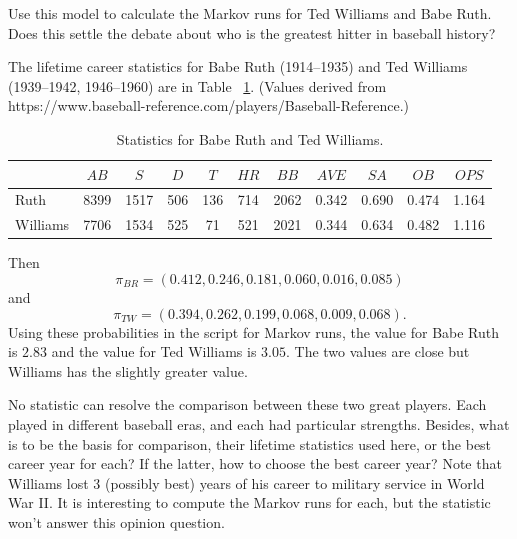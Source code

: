 \documentclass[12pt]{article}
\begin{document}
\begin{exercise}
    Use this model to calculate the Markov runs for Ted Williams and
    Babe Ruth.  Does this settle the debate about who is the greatest
    hitter in baseball history?
\end{exercise}
\begin{solution}
    The lifetime career statistics for Babe Ruth (1914--1935) and Ted
    Williams (1939--1942, 1946--1960) are in Table~%
    \ref{tab:baseball:ruthwilliams}.  (Values derived from \link
    {https://www.baseball-reference.com/players/}{Baseball-Reference}.)
    \begin{table}
        \centering
        \begin{tabular}{lcccccccccc}
        \toprule          & \(\mathit{AB}\)   & \(S\)   & \(D\)   & \(T\)   & \(\mathit{HR}\)   & \(\mathit{BB}\)   & \(\mathit{AVE}\)  & \(SA\)      & \(OB\)   & \(OPS\)   \\ 

            \midrule Ruth          & 8399 & 1517 & 506 & 136 & 714  &
                                                                      2062 & 0.342 & 0.690                                                                   & 0.474   & 1.164 \\ 
            Williams               & 7706 & 1534 & 525 & 71  & 521  & 2021 & 0.344                                                                         & 0.634   & 0.482 & 1.116 \\ 
            \bottomrule
        \end{tabular}
        \caption{Statistics for Babe Ruth and Ted Williams.}%
        \label{tab:baseball:ruthwilliams}
    \end{table}
    Then \[ \pi_{BR} = (0.412, 0.246, 0.181, 0.060, 0.016, 0.085) \] and
    \[ \pi_{TW} = (0.394, 0.262, 0.199, 0.068, 0.009, 0.068). \] Using
    these probabilities in the script for Markov runs, the value for
    Babe Ruth is \( 2.83 \) and the value for Ted Williams is \( 3.05 \).
    The two values are close but Williams has the slightly greater
    value.

    No statistic can resolve the comparison between these two great
    players.  Each played in different baseball eras, and each had
    particular strengths.  Besides, what is to be the basis for
    comparison, their lifetime statistics used here, or the best career
    year for each?  If the latter, how to choose the best career year?
    Note that Williams lost 3 (possibly best) years of his career to
    military service in World War II\@.  It is interesting to compute
    the Markov runs for each, but the statistic won't answer this
    opinion question.

\end{solution}
\end{document}
